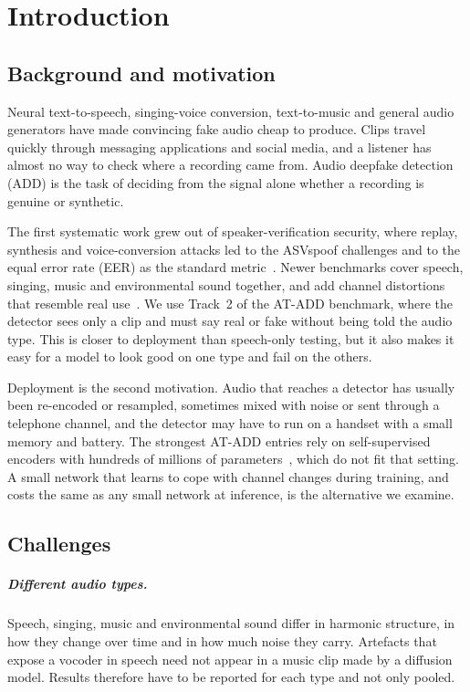 \chapter{Introduction}
\label{ch:introduction}

\section{Background and motivation}

Neural text-to-speech, singing-voice conversion, text-to-music and general audio generators have made convincing fake audio cheap to produce. Clips travel quickly through messaging applications and social media, and a listener has almost no way to check where a recording came from. Audio deepfake detection (ADD) is the task of deciding from the signal alone whether a recording is genuine or synthetic.

The first systematic work grew out of speaker-verification security, where replay, synthesis and voice-conversion attacks led to the ASVspoof challenges and to the equal error rate (EER) as the standard metric~\cite{kinnunen2017detection,wang2020asvspoof}. Newer benchmarks cover speech, singing, music and environmental sound together, and add channel distortions that resemble real use~\cite{xie2026atadd}. We use Track~2 of the AT-ADD benchmark, where the detector sees only a clip and must say real or fake without being told the audio type. This is closer to deployment than speech-only testing, but it also makes it easy for a model to look good on one type and fail on the others.

Deployment is the second motivation. Audio that reaches a detector has usually been re-encoded or resampled, sometimes mixed with noise or sent through a telephone channel, and the detector may have to run on a handset with a small memory and battery. The strongest AT-ADD entries rely on self-supervised encoders with hundreds of millions of parameters~\cite{xie2026atadd,fan2026dualssl}, which do not fit that setting. A small network that learns to cope with channel changes during training, and costs the same as any small network at inference, is the alternative we examine.

\section{Challenges}

\paragraph{Different audio types.} Speech, singing, music and environmental sound differ in harmonic structure, in how they change over time and in how much noise they carry. Artefacts that expose a vocoder in speech need not appear in a music clip made by a diffusion model. Results therefore have to be reported for each type and not only pooled.

